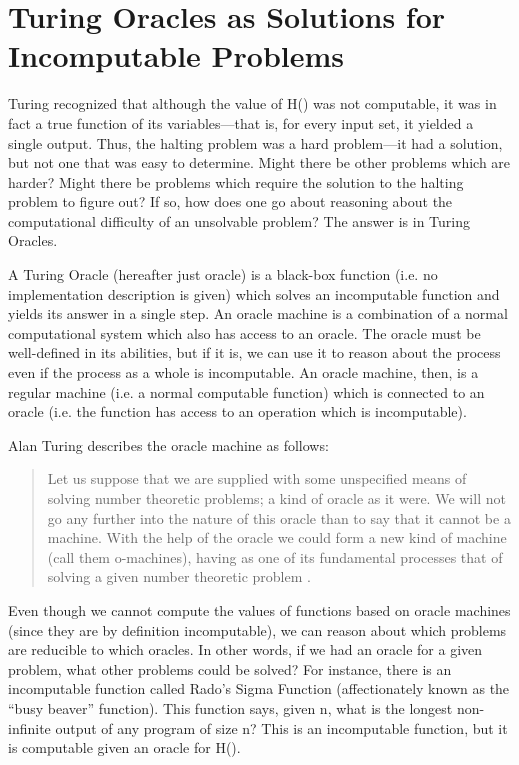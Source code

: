 \section[Turing Oracles as Solutions]{Turing Oracles as Solutions for Incomputable Problems}

Turing recognized that although the value of H() was not computable, it was in fact a true function of its variables---that is, for every input set, it yielded a single output.  Thus, the halting problem was a hard problem---it had a solution, but not one that was easy to determine.  Might there be other problems which are harder?  Might there be problems which require the solution to the halting problem to figure out?  If so, how does one go about reasoning about the computational difficulty of an unsolvable problem?  The answer is in Turing Oracles.  

A Turing Oracle (hereafter just oracle) is a black-box function (i.e. no implementation description is given) which solves an incomputable function and yields its answer in a single step.  An oracle machine is a combination of a normal computational system which also has access to an oracle.  The oracle must be well-defined in its abilities, but if it is, we can use it to reason about the process even if the process as a whole is incomputable.  An oracle machine, then, is a regular machine (i.e. a normal computable function) which is connected to an oracle (i.e. the function has access to an operation which is incomputable).

Alan Turing describes the oracle machine as follows:

\begin{quote}
Let us suppose that we are supplied with some unspecified means of solving number theoretic problems; a kind of oracle as it were.  We will not go any further into the nature of this oracle than to say that it cannot be a machine.  With the help of the oracle we could form a new kind of machine (call them o-machines), having as one of its fundamental processes that of solving a given number theoretic problem \citep{turing1939}.
\end{quote}

Even though we cannot compute the values of functions based on oracle machines (since they are by definition incomputable), we can reason about which problems are reducible to which oracles.  In other words, if we had an oracle for a given problem, what other problems could be solved?  For instance, there is an incomputable function called Rado's Sigma Function (affectionately known as the ``busy beaver'' function).  This function says, given n, what is the longest non-infinite output of any program of size n?  This is an incomputable function, but it is computable given an oracle for H().

